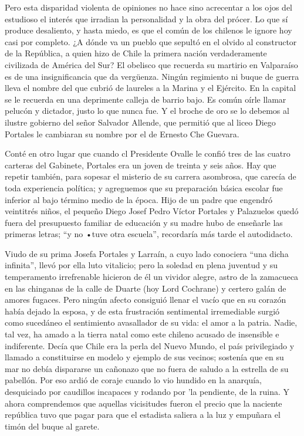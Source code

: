 \documentclass[10pt,twoside,openright]{memoir}
\begin{document}
Pero esta disparidad violenta de opiniones no hace sino acrecentar a los
ojos del estudioso el interés que irradian la personalidad y la obra del
prócer. Lo que sí produce desaliento,
y hasta miedo, es que el común de los chilenos le ignore hoy casi por
completo. ¿A dónde va un pueblo que sepultó en el olvido al constructor
de la República, a quien hizo de Chile
la primera nación verdaderamente
civilizada de América del Sur? El
obelisco que recuerda su martirio en Valparaíso es de una
insignificancia que da vergüenza. Ningún regimiento ni buque de guerra
lleva el nombre del que cubrió de laureles a la Marina y el Ejército. En
la capital se le recuerda en una deprimente calleja de barrio bajo. Es
común oírle llamar pelucón y dictador, justo lo que nunca fue. Y el
broche de oro se lo debemos al ilustre gobierno del señor Salvador
Allende, que permitió que al liceo Diego Portales le cambiaran su nombre
por el de Ernesto Che Guevara.

Conté en otro lugar que cuando cl Presidente Ovalle le confió tres de
las cuatro carteras del Gabinete, Portales era un joven de treinta y
seis años. Hay que repetir también, para sopesar el misterio de su
carrera asombrosa, que carecía de toda experiencia política; y
agreguemos que su preparación básica escolar fue inferior al bajo
término medio de la época. Hijo de un padre que engendró veintitrés
niños, el pequeño Diego Josef Pedro Víctor Portales y Palazuelos quedó
fuera del presupuesto familiar de educación y su madre hubo de enseñarle
las primeras letras; ``y no •tuve otra escuela'', recordaría más tarde el
autodidacto.

Viudo de su prima Josefa Portales y Larraín, a
cuyo lado conociera ``una dicha
infinita'', llevó por ella luto vitalicio; pero la soledad en plena
juventud y su temperamento irrefrenable hicieron de él un vividor
alegre, astro de la zamacueca en las chinganas de la calle de Duarte
(hoy Lord Cochrane) y certero galán de amores fugaces. Pero ningún
afecto consiguió llenar el vacío que en su corazón había dejado la
esposa, y de esta frustración sentimental irremediable surgió como
sucedáneo el sentimiento avasallador de su vida: el amor a la patria.
Nadie, tal vez, ha amado a la tierra natal como este chileno acusado de
insensible e indiferente. Decía que Chile era la perla del Nuevo Mundo,
el país privilegiado y llamado a constituirse en modelo y ejemplo de sus
vecinos; sostenía que en su mar no debía dispararse un cañonazo que no
fuera de saludo a la estrella de su pabellón. Por eso ardió de coraje
cuando lo vio hundido en la anarquía, desquiciado por caudillos
incapaces y rodando por 'la
pendiente, de la ruina. Y ahora comprendemos que aquellas vicisitudes
fueron el precio que la naciente república tuvo que pagar para que el
estadista saliera a la luz y empuñara el timón del buque al garete.
\end{document}
